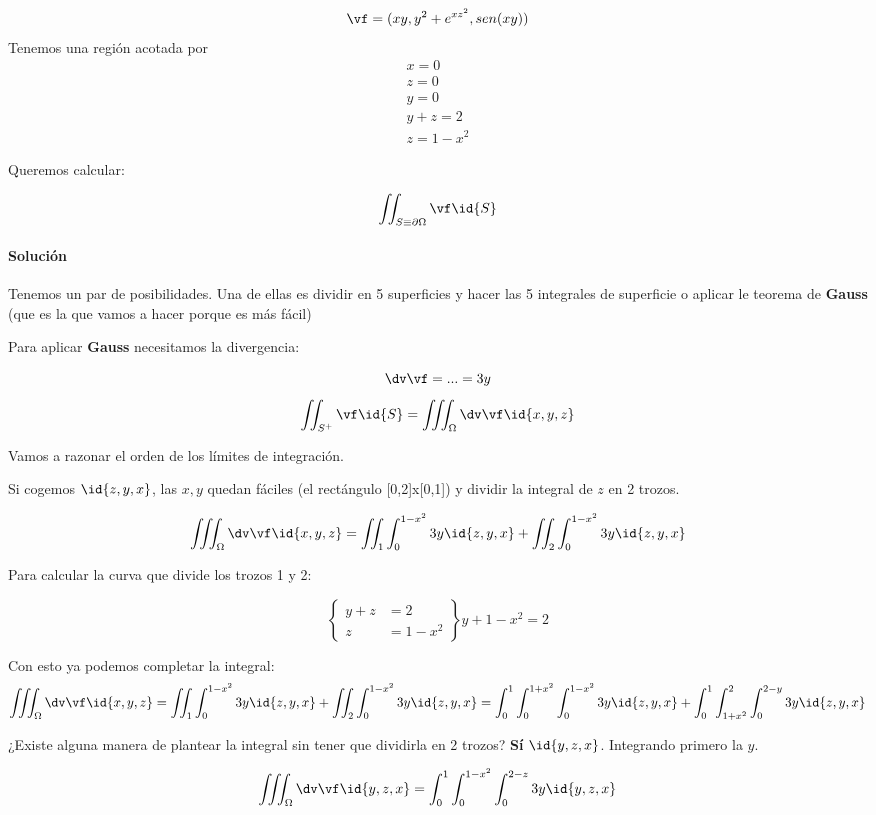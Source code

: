 \begin{example}
\[\vf = (xy,y^2+e^{xz^2},sen(xy))\]
Tenemos una región acotada por 
\begin{gather*}
x=0\\
z=0\\
y=0\\
y+z=2\\
z=1-x^2
\end{gather*}

Queremos calcular:

\[\iint_{S\equiv\partial \Omega} \vf \id{S}\]


\paragraph{Solución}

Tenemos un par de posibilidades. Una de ellas es dividir en 5 superficies y hacer las 5 integrales de superficie o aplicar le teorema de \textbf{Gauss} (que es la que vamos a hacer porque es más fácil)

Para aplicar \textbf{Gauss} necesitamos la divergencia:

\[\dv\vf = ... = 3y\]
\[
\iint_{S^+} \vf \id{S} = \iiint_{\Omega} \dv\vf \id{x,y,z}
\]

Vamos a razonar el orden de los límites de integración.

Si cogemos $\id{z,y,x}$, las $x,y$ quedan fáciles (el rectángulo [0,2]x[0,1]) y dividir la integral de $z$ en 2 trozos.

\[
\iiint_{\Omega} \dv\vf \id{x,y,z} = \iint_{1} \int_0^{1-x^2} 3y\id{z,y,x} + \iint_{2} \int_0^{1-x^2} 3y\id{z,y,x}
\]

Para calcular la curva que divide los trozos 1 y 2:

\[\left\{\begin{array}{cc}
y+z&=2\\
z&=1-x^2
\end{array} \right\} y+1-x^2=2\]

Con esto ya podemos completar la integral:
\[
\iiint_{\Omega} \dv\vf \id{x,y,z} = \iint_{1} \int_0^{1-x^2} 3y\id{z,y,x} + \iint_{2} \int_0^{1-x^2} 3y\id{z,y,x} = \int_0^1\int_0^{1+x^2}\int_0^{1-x^2}3y\id{z,y,x}+\int_0^1\int_{1+x^2}^{2}\int_0^{2-y}3y\id{z,y,x}
\]

¿Existe alguna manera de plantear la integral sin tener que dividirla en 2 trozos? \textbf{Sí} $\id{y,z,x}$. Integrando primero la $y$.

\[
\iiint_{\Omega} \dv\vf\id{y,z,x} = \int_0^1\int_0^{1-x^2}\int_0^{2-z}3y\id{y,z,x}
\]

\end{example}

